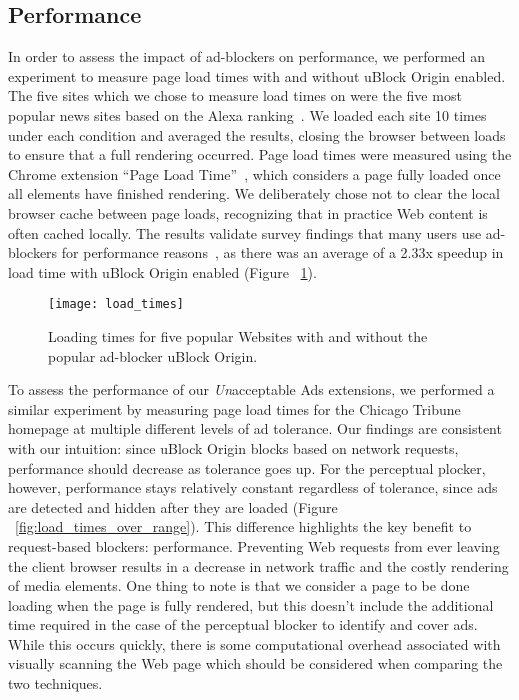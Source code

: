 \subsection{Performance}
In order to assess the impact of ad-blockers on performance, we performed an experiment to measure page load times with and without uBlock Origin enabled.
The five sites which we chose to measure load times on were the five most popular news sites based on the Alexa ranking~\cite{alexa}.
We loaded each site 10 times under each condition and averaged the results, closing the browser between loads to ensure that a full rendering occurred.
Page load times were measured using the Chrome extension ``Page Load Time''~\cite{pageloadtime}, which considers a page fully loaded once all elements have finished rendering.
We deliberately chose not to clear the local browser cache between page loads, recognizing that in practice Web content is often cached locally.
The results validate survey findings that many users use ad-blockers for performance reasons~\cite{hubspot2016adblock}, as there was an average of a 2.33x speedup in load time with uBlock Origin enabled (Figure ~\ref{fig:load_times}).

\begin{figure}[t]
\centering
\texttt{[image: load\_times]}
\caption{Loading times for five popular Websites with and without the popular ad-blocker uBlock Origin.}
\label{fig:load_times}
\end{figure}

To assess the performance of our \textit{Un}acceptable Ads extensions, we performed a similar experiment by measuring page load times for the Chicago Tribune homepage at multiple different levels of ad tolerance.
Our findings are consistent with our intuition: since uBlock Origin blocks based on network requests, performance should decrease as tolerance goes up.
For the perceptual plocker, however, performance stays relatively constant regardless of tolerance, since ads are detected and hidden after they are loaded (Figure ~\ref{fig:load_times_over_range}).
This difference highlights the key benefit to request-based blockers: performance.
Preventing Web requests from ever leaving the client browser results in a decrease in network traffic and the costly rendering of media elements.
One thing to note is that we consider a page to be done loading when the page is fully rendered, but this doesn't include the additional time required in the case of the perceptual blocker to identify and cover ads.
While this occurs quickly, there is some computational overhead associated with visually scanning the Web page which should be considered when comparing the two techniques.

